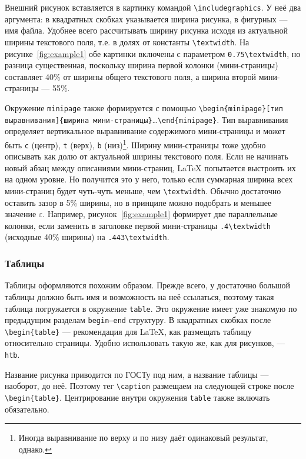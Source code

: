 \documentclass[14pt,russian]{scrartcl}
\begin{document}
Внешний рисунок вставляется в картинку командой \texttt{\textbackslash includegraphics}. У неё два аргумента: в квадратных скобках указывается ширина рисунка, в фигурных --- имя файла. Удобнее всего рассчитывать ширину рисунка исходя из актуальной ширины текстового поля, т.е. в долях от константы \texttt{\textbackslash textwidth}. На рисунке~\ref{fig:example1} обе картинки включены с параметром \texttt{0.75\textbackslash textwidth}, но разница существенная, поскольку ширина первой колонки (мини-страницы) составляет 40\% от ширины общего текстового поля, а ширина второй мини-страницы --- 55\%. 

Окружение \texttt{minipage} также формируется с помощью \texttt{\textbackslash begin\{minipage\}[тип выравнивания]\{ширина мини-страницы\}}\dots\texttt{\textbackslash end\{minipage\}}. Тип выравнивания определяет вертикальное выравнивание содержимого мини-страницы и может быть \texttt{c} (центр), \texttt{t} (верх), \texttt{b} (низ)\footnote{Иногда выравнивание по верху и по низу даёт одинаковый результат, однако.}. Ширину мини-страницы тоже удобно описывать как долю от актуальной ширины текстового поля. Если не начинать новый абзац между описаниями мини-страниц, \LaTeX{} попытается выстроить их на одном уровне. Но получится это у него, только если суммарная ширина всех мини-страниц будет чуть-чуть меньше, чем \texttt{\textbackslash textwidth}. Обычно достаточно оставить зазор в 5\% ширины, но в принципе можно подобрать и меньшее значение $\varepsilon$. Например, рисунок~\ref{fig:example1} формирует две параллельные колонки, если заменить в заголовке первой мини-страницы \texttt{.4\textbackslash textwidth} (исходные 40\% ширины) на \texttt{.443\textbackslash textwidth}. 

\subsubsection{Таблицы}

Таблицы оформляются похожим образом. Прежде всего, у достаточно большой таблицы должно быть имя и возможность на неё ссылаться, поэтому такая таблица погружается в окружение \texttt{table}. Это окружение имеет уже знакомую по предыдущим разделам \texttt{begin--end} структуру. В квадратных скобках после \texttt{\textbackslash begin\{table\}} --- рекомендация для \LaTeX, как размещать таблицу относительно страницы. Удобно использовать такую же, как для рисунков, --- \texttt{htb}.

Название рисунка приводится по ГОСТу под ним, а название таблицы --- наоборот, до неё. Поэтому тег \texttt{\textbackslash caption} размещаем на следующей строке после \texttt{\textbackslash begin\{table\}}. Центрирование внутри окружения \texttt{table} также включать обязательно.
\end{document}
